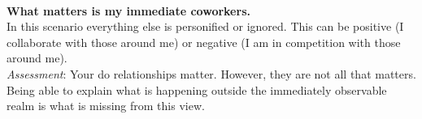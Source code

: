 \ \\

\textbf{What matters is my immediate coworkers.}\\
In this scenario everything else is personified or ignored. This can be positive (I collaborate with those around me) or negative (I am in competition with those around me). \\
\textit{Assessment}: Your do relationships matter. However, they are not all that matters. Being able to explain what is happening outside the immediately observable realm is what is missing from this view. 
